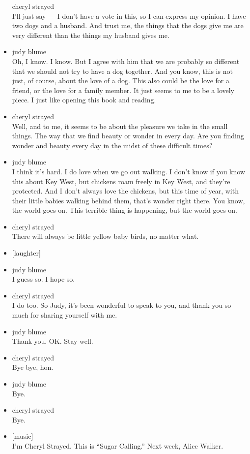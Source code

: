 \begin{itemize}
  cheryl strayed\\
  I'll just say --- I don't have a vote in this, so I can express my
  opinion. I have two dogs and a husband. And trust me, the things that
  the dogs give me are very different than the things my husband gives
  me.
\item
  judy blume\\
  Oh, I know. I know. But I agree with him that we are probably so
  different that we should not try to have a dog together. And you know,
  this is not just, of course, about the love of a dog. This also could
  be the love for a friend, or the love for a family member. It just
  seems to me to be a lovely piece. I just like opening this book and
  reading.
\item
  cheryl strayed\\
  Well, and to me, it seems to be about the pleasure we take in the
  small things. The way that we find beauty or wonder in every day. Are
  you finding wonder and beauty every day in the midst of these
  difficult times?
\item
  judy blume\\
  I think it's hard. I do love when we go out walking. I don't know if
  you know this about Key West, but chickens roam freely in Key West,
  and they're protected. And I don't always love the chickens, but this
  time of year, with their little babies walking behind them, that's
  wonder right there. You know, the world goes on. This terrible thing
  is happening, but the world goes on.
\item
  cheryl strayed\\
  There will always be little yellow baby birds, no matter what.
\item
  {[}laughter{]}
\item
  judy blume\\
  I guess so. I hope so.
\item
  cheryl strayed\\
  I do too. So Judy, it's been wonderful to speak to you, and thank you
  so much for sharing yourself with me.
\item
  judy blume\\
  Thank you. OK. Stay well.
\item
  cheryl strayed\\
  Bye bye, hon.
\item
  judy blume\\
  Bye.
\item
  cheryl strayed\\
  Bye.
\item
  {[}music{]}\\
  I'm Cheryl Strayed. This is ``Sugar Calling.'' Next week, Alice
  Walker.
\end{itemize}

